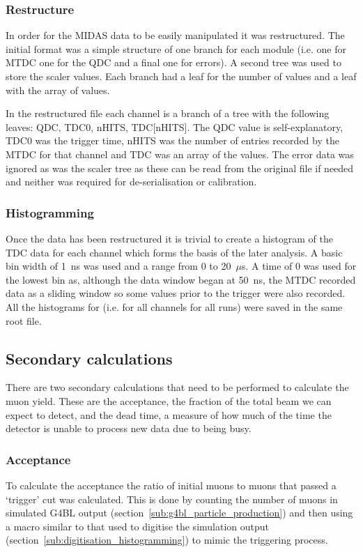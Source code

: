 \subsubsection{Restructure} %
\label{sub:restructure}
In order for the MIDAS data to be easily manipulated it was restructured. The initial format was a simple structure of one branch for each module (i.e. one for MTDC one for the QDC and a final one for errors). A second tree was used to store the scaler values. Each branch had a leaf for the number of values and a leaf with the array of values.

In the restructured file each channel is a branch of a tree with the following leaves: QDC, TDC0, nHITS, TDC[nHITS]. The QDC value is self-explanatory, TDC0 was the trigger time, nHITS was the number of entries recorded by the MTDC for that channel and TDC was an array of the values. The error data was ignored as was the scaler tree as these can be read from the original file if needed and neither was required for de-serialisation or calibration.
\subsubsection{Histogramming} %
\label{sub:Histogramming}
Once the data has been restructured it is trivial to create a histogram of the TDC data for each channel which forms the basis of the later analysis. A basic bin width of 1~ns was used and a range from 0 to 20~\(\mu\)s. A time of 0 was used for the lowest bin as, although the data window began at 50~ns, the MTDC recorded data as a sliding window so some values prior to the trigger were also recorded. All the histograms for (i.e. for all channels for all runs) were saved in the same root file.
\subsection{Secondary calculations} %
\label{sec:secondary_calculations}
There are two secondary calculations that need to be performed to calculate the muon yield. These are the acceptance, the fraction of the total beam we can expect to detect, and the dead time, a measure of how much of the time the detector is unable to process new data due to being busy.
\subsubsection{Acceptance} %
\label{sub:acceptance}
To calculate the acceptance the ratio of initial muons to muons that passed a `trigger' cut was calculated. This is done by counting the number of muons in simulated G4BL output (section~\ref{sub:g4bl_particle_production}) and then using a macro similar to that used to digitise the simulation output (section~\ref{sub:digitisation_histogramming}) to mimic the triggering process.

